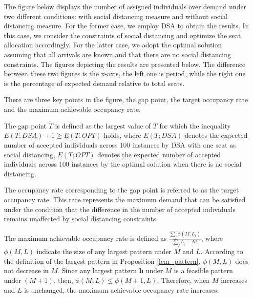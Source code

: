 
The figure below displays the number of assigned individuals over demand under two different conditions: with social distancing measure and without social distancing measure. For the former case, we employ DSA to obtain the results. In this case, we consider the constraints of social distancing and optimize the seat allocation accordingly. For the latter case, we adopt the optimal solution assuming that all arrivals are known and that there are no social distancing constraints. The figures depicting the results are presented below. The difference between these two figures is the x-axis, the left one is period, while the right one is the percentage of expected demand relative to total seats. 

There are three key points in the figure, the gap point, the target occupancy rate and the maximum achievable occupancy rate.

The gap point $\tilde{T}$ is defined as the largest value of $T$ for which the inequality $E(T; DSA)+1 \geq E(T; OPT)$ holds, where $E(T; DSA)$ denotes the expected number of accepted individuals  across 100 instances by DSA with one seat as social distancing, $E(T; OPT)$ denotes the expected number of accepted individuals across 100 instances by the optimal solution when there is no social distancing. 

The occupancy rate corresponding to the gap point is referred to as the target occupancy rate. This rate represents the maximum demand that can be satisfied under the condition that the difference in the number of accepted individuals remains unaffected by social distancing constraints.

The maximum achievable occupancy rate is defined as $\frac{\sum_{j}\phi(M, L_{j})}{\sum_{j} L_{j}- N \delta}$, where $\phi(M, L)$ indicate the size of any largest pattern under $M$ and $L$. According to the definition of the largest pattern in Proposition \ref{lem_pattern}, $\phi(M, L)$ does not decrease in $M$. Since any largest pattern $\bm{h}$ under $M$ is a feasible pattern under $(M+1)$, then, $\phi(M, L) \leq \phi(M+1, L)$. Therefore, when $M$ increases and $L$ is unchanged, the maximum achievable occupancy rate increases.

